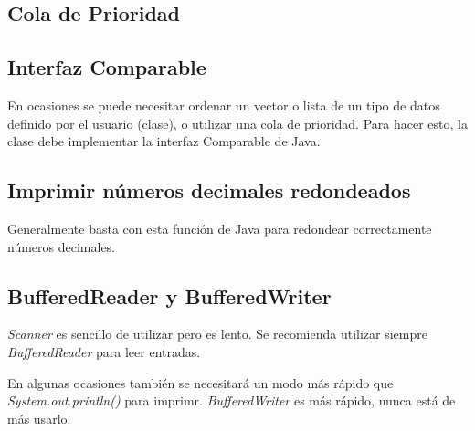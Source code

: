 \documentclass{article}
\begin{document}
\begin{multicols}{2}
	\subsection{Cola de Prioridad}
	
	\subsection{Interfaz Comparable}
	En ocasiones se puede necesitar ordenar un vector o lista de un tipo de datos definido por el usuario (clase), o utilizar una cola de prioridad. Para hacer esto, la clase debe implementar la interfaz Comparable de Java.
	
	\subsection{Imprimir números decimales redondeados}
	Generalmente basta con esta función de Java para redondear correctamente números decimales.	
	
	
	\subsection{BufferedReader y BufferedWriter}
	\emph{Scanner} es sencillo de utilizar pero es lento. Se recomienda utilizar siempre \emph{BufferedReader} para leer entradas.
	
	En algunas ocasiones también se necesitará un modo más rápido que \emph{System.out.println()} para imprimr. \emph{BufferedWriter} es más rápido, nunca está de más usarlo.
	
\end{multicols}	
\end{document}
